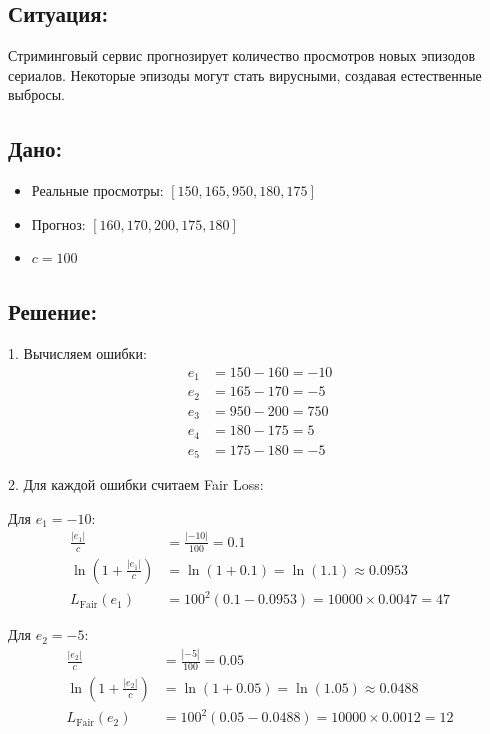 \subsection*{Ситуация:} Стриминговый сервис прогнозирует количество просмотров новых эпизодов сериалов. Некоторые эпизоды могут стать вирусными, создавая естественные выбросы.

\subsection*{Дано:}
\begin{itemize}
    \item Реальные просмотры: $[150, 165, 950, 180, 175]$
    \item Прогноз: $[160, 170, 200, 175, 180]$
    \item $c = 100$
\end{itemize}

\subsection*{Решение:}
1. Вычисляем ошибки:
\[
    \begin{aligned}
        e_1 & = 150 - 160 = -10 \\
        e_2 & = 165 - 170 = -5  \\
        e_3 & = 950 - 200 = 750 \\
        e_4 & = 180 - 175 = 5   \\
        e_5 & = 175 - 180 = -5
    \end{aligned}
\]

2. Для каждой ошибки считаем Fair Loss:

Для $e_1 = -10$:
\[
    \begin{aligned}
        \frac{|e_1|}{c}                     & = \frac{|-10|}{100} = 0.1                        \\
        \ln\left(1 + \frac{|e_1|}{c}\right) & = \ln(1 + 0.1) = \ln(1.1) \approx 0.0953         \\
        L_{\text{Fair}}(e_1)                & = 100^2(0.1 - 0.0953) = 10000 \times 0.0047 = 47
    \end{aligned}
\]

Для $e_2 = -5$:
\[
    \begin{aligned}
        \frac{|e_2|}{c}                     & = \frac{|-5|}{100} = 0.05                         \\
        \ln\left(1 + \frac{|e_2|}{c}\right) & = \ln(1 + 0.05) = \ln(1.05) \approx 0.0488        \\
        L_{\text{Fair}}(e_2)                & = 100^2(0.05 - 0.0488) = 10000 \times 0.0012 = 12
    \end{aligned}
\]

